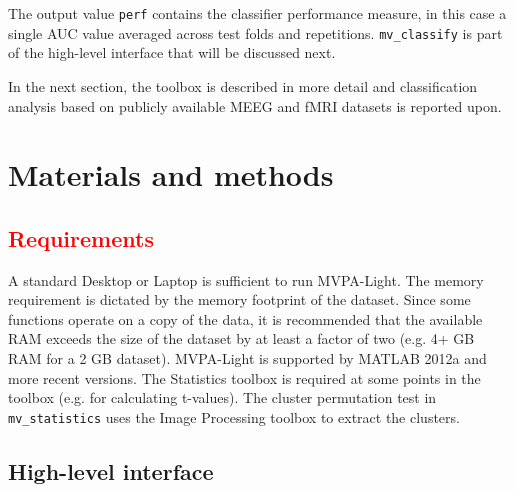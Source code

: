 \documentclass[utf8]{frontiersSCNS} %
\newcommand{\ttt}[1]{\texttt{#1}}
\newcommand{\red}[1]{\textcolor{red}{#1}}
\begin{document}
The output value \ttt{perf} contains the classifier performance measure, in this case a single AUC value averaged across test folds and repetitions. \ttt{mv\_classify} is part of the high-level interface that will be discussed next.

In the next section, the toolbox is described in more detail and classification analysis based on publicly available MEEG \citep{Wakeman2014OpenfMRI,Wakeman2015ADataset} and fMRI \citep{Haxby2001} datasets is reported upon.

\section{Materials and methods}

\red{\subsection{Requirements}}

A standard Desktop or Laptop is sufficient to run MVPA-Light. The memory requirement is dictated by the memory footprint  of the dataset. Since some functions operate on a copy of the data, it is recommended that the available RAM exceeds the size of the dataset by at least a factor of two (e.g. 4+ GB RAM for a 2 GB dataset). MVPA-Light is supported by MATLAB 2012a and more recent versions. The Statistics toolbox is required at some points in the toolbox (e.g. for calculating t-values). The cluster permutation test in \ttt{mv\_statistics} uses the Image Processing toolbox to extract the clusters.

\subsection{High-level interface}
\end{document}
